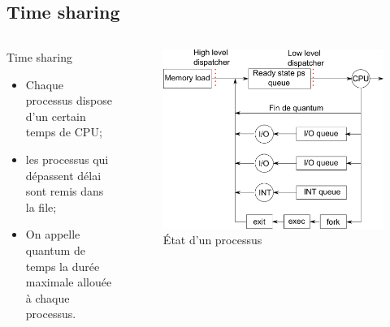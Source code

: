 \section{\sectitle}
\begin{frame}{\sectitle}
\def\subsectitle{Time sharing}
\subsection{\subsectitle}

\begin{columns}[c]
\begin{block}{\subsectitle}
\begin{itemize}
    \item Chaque processus dispose d'un certain temps de CPU;
    \item les processus qui dépassent délai sont remis dans la file;
    \item On appelle quantum de temps la durée maximale allouée à chaque
    processus.
\end{itemize}
\end{block}

\begin{figure}
\includegraphics[width=\textwidth]{images/timesharingDispatching.pdf}
\caption{État d'un processus}
\end{figure}
\end{columns}

\end{frame}


